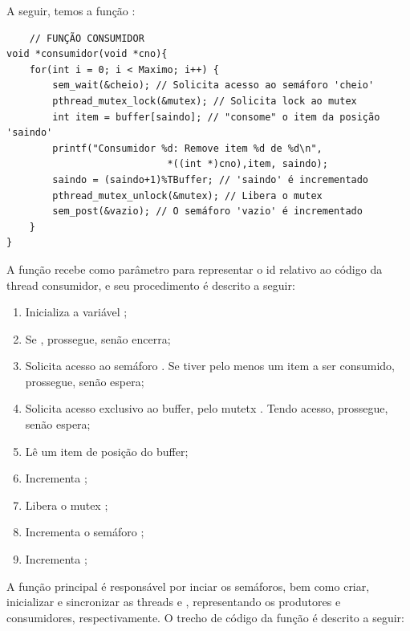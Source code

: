 \documentclass[
	12pt,				%
	openright,			%
	oneside,			%
	a4paper,			%
	chapter=TITLE,		%
	english,			%
	french,				%
	spanish,			%
	brazil				%
	]{abntex2}
\theoremstyle{definition}
\begin{document}
A seguir, temos a função :

\begin{verbatim}
    // FUNÇÃO CONSUMIDOR
void *consumidor(void *cno){
    for(int i = 0; i < Maximo; i++) {
        sem_wait(&cheio); // Solicita acesso ao semáforo 'cheio'
        pthread_mutex_lock(&mutex); // Solicita lock ao mutex 
        int item = buffer[saindo]; // "consome" o item da posição 'saindo' 
        printf("Consumidor %d: Remove item %d de %d\n",
                            *((int *)cno),item, saindo);
        saindo = (saindo+1)%TBuffer; // 'saindo' é incrementado 
        pthread_mutex_unlock(&mutex); // Libera o mutex
        sem_post(&vazio); // O semáforo 'vazio' é incrementado
    }
}
\end{verbatim}

A função recebe  como parâmetro para representar o id relativo ao código da thread consumidor, e seu procedimento é descrito a seguir:
\begin{enumerate}
    \item Inicializa a variável ;
    \item Se , prossegue, senão encerra;
    \item Solicita acesso ao semáforo . Se tiver pelo menos um item a ser consumido, prossegue, senão espera;
    \item Solicita acesso exclusivo ao buffer, pelo mutetx . Tendo acesso, prossegue, senão espera;
    \item Lê um item de posição  do buffer;
    \item Incrementa ;
    \item Libera o mutex ;
    \item Incrementa o semáforo ;
    \item Incrementa ;
\end{enumerate}

A função principal  é responsável por inciar os semáforos, bem como criar, inicializar e sincronizar as threads  e , representando os produtores e consumidores, respectivamente. O trecho de código  da função  é descrito a seguir:
\end{document}

